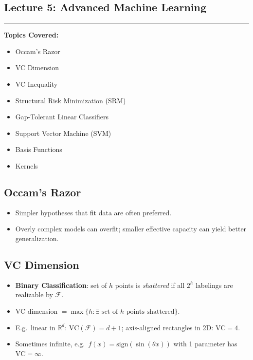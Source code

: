 \documentclass[10pt]{article}
\begin{document}
\begin{multicols}{2}
\section*{Lecture 5: Advanced Machine Learning}
\vspace{-0.5em}
\hrule
\vspace{1em}

\textbf{Topics Covered:}
\begin{itemize}
\item Occam's Razor
\item VC Dimension
\item VC Inequality
\item Structural Risk Minimization (SRM)
\item Gap-Tolerant Linear Classifiers
\item Support Vector Machine (SVM)
\item Basis Functions
\item Kernels
\end{itemize}

\subsection*{Occam's Razor}
\begin{itemize}
\item Simpler hypotheses that fit data are often preferred.
\item Overly complex models can overfit; smaller effective capacity can yield better generalization.
\end{itemize}

\subsection*{VC Dimension}
\begin{itemize}
\item \textbf{Binary Classification}: set of $h$ points is \emph{shattered} if all $2^h$ labelings are realizable by $\mathcal{F}$.
\item VC dimension $= \max\{h: \exists \text{ set of $h$ points shattered}\}$.
\item E.g.\ linear in $\mathbb{R}^d$: $\mathrm{VC}(\mathcal{F})=d+1$; axis-aligned rectangles in 2D: $\mathrm{VC}=4$.
\item Sometimes infinite, e.g.\ $f(x)=\mathrm{sign}(\sin(\theta x))$ with 1 parameter has $\mathrm{VC}=\infty$.
\end{itemize}


\end{multicols}
\end{document}
